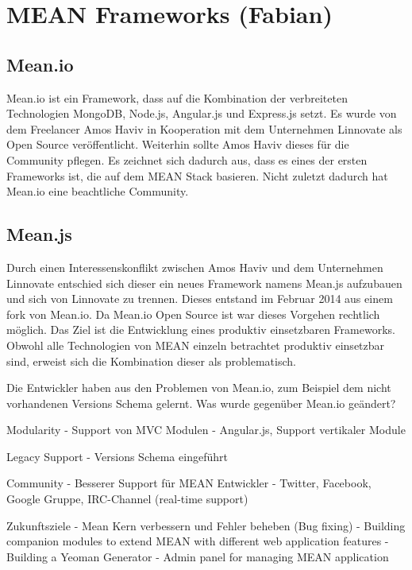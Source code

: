 \section{MEAN Frameworks (Fabian)}\label{mean-frameworks-fabian}

\subsection{Mean.io}\label{mean.io}

Mean.io ist ein Framework, dass auf die Kombination der verbreiteten
Technologien MongoDB, Node.js, Angular.js und Express.js setzt. Es wurde
von dem Freelancer Amos Haviv in Kooperation mit dem Unternehmen
Linnovate als Open Source veröffentlicht. Weiterhin sollte Amos Haviv
dieses für die Community pflegen. Es zeichnet sich dadurch aus, dass es
eines der ersten Frameworks ist, die auf dem MEAN Stack basieren. Nicht
zuletzt dadurch hat Mean.io eine beachtliche Community.

\subsection{Mean.js}\label{mean.js}

Durch einen Interessenskonflikt zwischen Amos Haviv und dem Unternehmen
Linnovate entschied sich dieser ein neues Framework namens Mean.js
aufzubauen und sich von Linnovate zu trennen. Dieses entstand im Februar
2014 aus einem fork von Mean.io. Da Mean.io Open Source ist war dieses
Vorgehen rechtlich möglich. Das Ziel ist die Entwicklung eines produktiv
einsetzbaren Frameworks. Obwohl alle Technologien von MEAN einzeln
betrachtet produktiv einsetzbar sind, erweist sich die Kombination
dieser als problematisch.

Die Entwickler haben aus den Problemen von Mean.io, zum Beispiel dem
nicht vorhandenen Versions Schema gelernt. Was wurde gegenüber Mean.io
geändert?

Modularity - Support von MVC Modulen - Angular.js, Support vertikaler
Module

Legacy Support - Versions Schema eingeführt

Community - Besserer Support für MEAN Entwickler - Twitter, Facebook,
Google Gruppe, IRC-Channel (real-time support)

Zukunftsziele - Mean Kern verbessern und Fehler beheben (Bug fixing) -
Building companion modules to extend MEAN with different web application
features - Building a Yeoman Generator - Admin panel for managing MEAN
application


